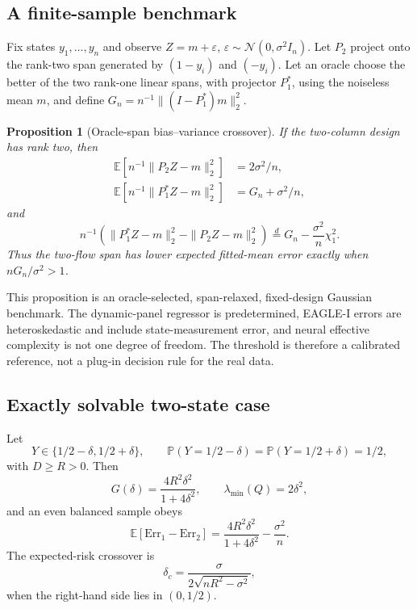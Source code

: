 \documentclass[twoside]{article}
\newcommand{\E}{\mathbb{E}}
\newcommand{\Pp}{\mathbb{P}}
\theoremstyle{plain}
\newtheorem{proposition}{Proposition}
\theoremstyle{definition}
\theoremstyle{remark}
\begin{document}
\subsection{A finite-sample benchmark}

Fix states \(y_1,\ldots,y_n\) and observe
\(Z=m+\varepsilon\), \(\varepsilon\sim\mathcal N(0,\sigma^2I_n)\).
Let \(P_2\) project onto the rank-two span generated by \((1-y_i)\) and
\((-y_i)\). Let an oracle choose the better of the two rank-one linear spans,
with projector \(P_1^*\), using the noiseless mean \(m\), and define
\(G_n=n^{-1}\|(I-P_1^*)m\|_2^2\).

\begin{proposition}[Oracle-span bias--variance crossover]
\label{prop:crossover}
If the two-column design has rank two, then
\begin{align}
\E[n^{-1}\|P_2Z-m\|_2^2]&=2\sigma^2/n,\nonumber\\
\E[n^{-1}\|P_1^*Z-m\|_2^2]&=G_n+\sigma^2/n,
\label{eq:risks}
\end{align}
and
\begin{equation}
n^{-1}(\|P_1^*Z-m\|_2^2-\|P_2Z-m\|_2^2)
\overset{d}{=}G_n-\frac{\sigma^2}{n}\chi_1^2.
\label{eq:chisq}
\end{equation}
Thus the two-flow span has lower expected fitted-mean error exactly when
\(nG_n/\sigma^2>1\).
\end{proposition}

This proposition is an oracle-selected, span-relaxed, fixed-design Gaussian
benchmark. The dynamic-panel regressor is predetermined, EAGLE-I errors are
heteroskedastic and include state-measurement error, and neural effective
complexity is not one degree of freedom. The threshold is therefore a calibrated
reference, not a plug-in decision rule for the real data.

\subsection{Exactly solvable two-state case}

Let
\begin{equation}
Y\in\{1/2-\delta,1/2+\delta\},\qquad
\Pp(Y=1/2-\delta)=\Pp(Y=1/2+\delta)=1/2,
\end{equation}
with \(D\ge R>0\). Then
\begin{equation}
G(\delta)=\frac{4R^2\delta^2}{1+4\delta^2},
\qquad \lambda_{\min}(Q)=2\delta^2,
\end{equation}
and an even balanced sample obeys
\begin{equation}
\boxed{
\E[\mathrm{Err}_1-\mathrm{Err}_2]
=\frac{4R^2\delta^2}{1+4\delta^2}-\frac{\sigma^2}{n}.}
\label{eq:solvable}
\end{equation}
The expected-risk crossover is
\begin{equation}
\delta_c=\frac{\sigma}{2\sqrt{nR^2-\sigma^2}},
\end{equation}
when the right-hand side lies in \((0,1/2)\).
\end{document}
